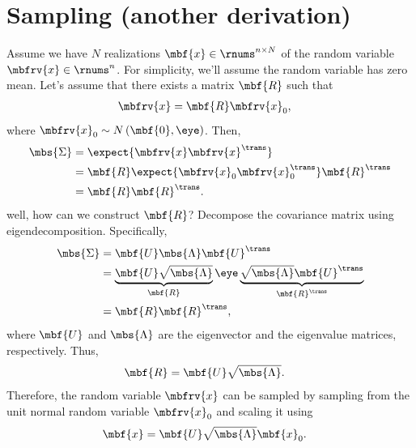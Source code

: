 \section{Sampling (another derivation)}
Assume we have $N$ realizations $\mbf{x}\in\rnums^{n\times N}$ of the random variable $\mbfrv{x}\in\rnums^{n}$. For simplicity, we'll assume the random variable has zero mean. 
% 
Let's assume that there exists a matrix $\mbf{R}$ such that
\begin{align}
    \mbfrv{x} &= \mbf{R}\mbfrv{x}_{0},
\end{align}
where $\mbfrv{x}_{0}\sim{N}\left( \mbf{0},\eye \right)$. Then,
\begin{align}
    \mbs{\Sigma} &= \expect{\mbfrv{x}\mbfrv{x}^{\trans}}\\
     &= \mbf{R}\expect{\mbfrv{x}_{0}\mbfrv{x}_{0}^{\trans}}\mbf{R}^{\trans}\\
     &= \mbf{R}\mbf{R}^{\trans}.
\end{align}
well, how can we construct $\mbf{R}$? Decompose the covariance matrix using eigendecomposition. Specifically,
\begin{align}
    \mbs{\Sigma} 
    &= \mbf{U}\mbs{\Lambda}\mbf{U}^{\trans}\\
    &= \underbrace{\mbf{U}\sqrt{\mbs{\Lambda}}}_{\mbf{R}}\eye\underbrace{\sqrt{\mbs{\Lambda}}\mbf{U}^{\trans}}_{\mbf{R}^{\trans}}\\
    &= \mbf{R}\mbf{R}^{\trans},
\end{align}
where $\mbf{U}$ and $\mbs{\Lambda}$ are the eigenvector and the eigenvalue matrices, respectively. 
Thus, 
\begin{align}
    \mbf{R} &= \mbf{U}\sqrt{\mbs{\Lambda}}.
\end{align}
Therefore, the random variable $\mbfrv{x}$ can be sampled by sampling from the unit normal random variable $\mbfrv{x}_{0}$ and scaling it using
\begin{align}
    \mbf{x} &= \mbf{U}\sqrt{\mbs{\Lambda}}\mbf{x}_{0}.
\end{align}


